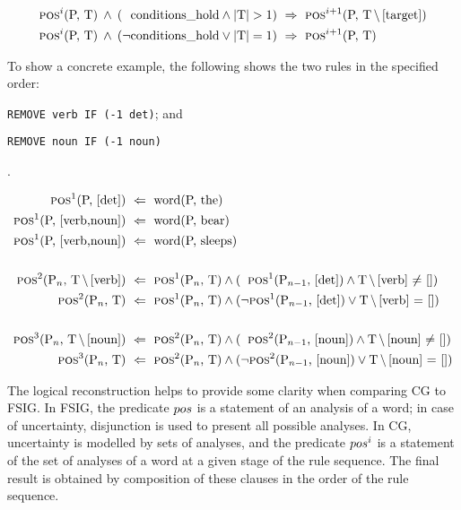 \begin{align*}
\text{{\sc pos}}^i\text{(P, T)} \: \wedge \: (\;\:\,  \text{conditions\_hold}
\wedge  \text{|T|} > 1) \  &\Rightarrow \  \text{{\sc pos}}^{i+1}\text{(P, T$\,\setminus\,$[target])} \\
\text{{\sc pos}}^i\text{(P, T)} \: \wedge \: (\neg \text{conditions\_hold} \vee
\text{|T|} = 1) \  &\Rightarrow \ \text{{\sc pos}}^{i+1}\text{(P, T)}
\end{align*}


To show a concrete example, the following shows the two rules in the specified order:
\begin{inparaenum}
\def\labelenumi{\arabic{enumi}.}
\itemsep1pt\parskip0pt
\item \texttt{REMOVE verb IF (-1 det)}; and
\item  \texttt{REMOVE noun IF (-1 noun)}
\end{inparaenum}.

\begin{align*}
\text{{\sc pos}$^1$(P, [det])} \  &\Leftarrow \  \text{word(P, the)} \\
\text{{\sc pos}$^1$(P, [verb,noun])} \ &\Leftarrow \ \text{word(P, bear)} \\
\text{{\sc pos}$^1$(P, [verb,noun])} \ &\Leftarrow \ \text{word(P, sleeps)} \\ \\
\text{{\sc pos}$^2$(P$_n$, T$\,\setminus\,$[verb])} \ &\Leftarrow \ \text{{\sc pos}$^1$(P$_n$, T)}
 \wedge (\;\; \text{{\sc pos}$^1$(P$_{n-1}$, [det])}  \wedge  \text{T$\,\setminus\,$[verb] $\neq$ []}) \\
\text{{\sc pos}$^2$(P$_n$, T)} \ &\Leftarrow \  \text{{\sc pos}$^1$(P$_n$, T)} \wedge
(\neg \text{{\sc pos}$^1$(P$_{n-1}$, [det])} \vee \text{T$\,\setminus\,$[verb]
  $=$ []}) \\ \\
\text{{\sc pos}$^3$(P$_n$, T$\,\setminus\,$[noun])} \ &\Leftarrow \ \text{{\sc pos}$^2$(P$_n$, T)}
 \wedge (\;\; \text{{\sc pos}$^2$(P$_{n-1}$, [noun])}  \wedge  \text{T$\,\setminus\,$[noun] $\neq$ []}) \\
\text{{\sc pos}$^3$(P$_n$, T)} \ &\Leftarrow \  \text{{\sc pos}$^2$(P$_n$, T)} \wedge
(\neg \text{{\sc pos}$^2$(P$_{n-1}$, [noun])} \vee \text{T$\,\setminus\,$[noun]
  $=$ []})
\end{align*}

The logical reconstruction helps to provide some clarity when comparing CG
to FSIG. In FSIG, the predicate ${\sc pos}$ is a statement of an analysis of a
word; in case of uncertainty, disjunction is used to present all possible analyses. In CG, uncertainty is modelled by sets of analyses,
and the predicate ${\sc pos}^i$ is a statement of the
set of analyses of a word at a given stage of the rule sequence. The
final result is obtained by composition of these clauses in the order of
the rule sequence.


